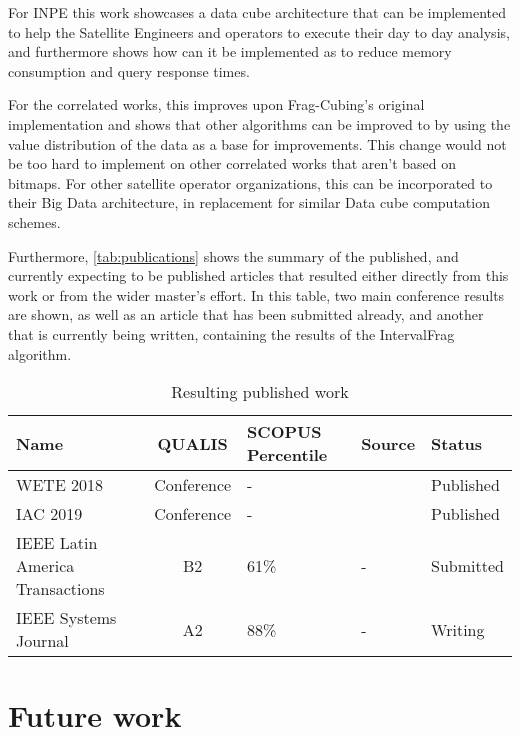 For INPE this work showcases a data cube architecture that can be implemented to help the Satellite Engineers and operators to execute their day to day analysis, and furthermore shows how can it be implemented as to reduce memory consumption and query response times.

For the correlated works, this improves upon Frag-Cubing's original implementation and shows that other algorithms can be improved to by using the value distribution of the data as a base for improvements.
This change would not be too hard to implement on other correlated works that aren't based on bitmaps.
For other satellite operator organizations, this can be incorporated to their Big Data architecture, in replacement for similar Data cube computation schemes.

Furthermore, \autoref{tab:publications} shows the summary of the published, and currently expecting to be published articles that resulted either directly from this work or from the wider master's effort.
In this table, two main conference results are shown, as well as an article that has been submitted already, and another that is currently being written, containing the results of the IntervalFrag algorithm.

\begin{table}[!htb]
  \begin{center}
    \caption{Resulting published work}\label{tab:publications}
    \begin{tabular}{|C{2.3cm}|c|C{2.2cm}|C{2.4cm}|C{2.9cm}|}
      \hline
      \textbf{Name} &\bfseries QUALIS & \bfseries SCOPUS Percentile & \bfseries Source &\bfseries Status \\
      \hline
      WETE 2018 & Conference & - & \cite{PereiraFerrSilv:2018:StApOL} & Published \\
      \hline
      IAC 2019 & Conference & - & \cite{pereiraLessonsLearnedSystems2019} & Published \\
      \hline
      IEEE Latin America Transactions & B2 & 61\% & - & Submitted \\
      \hline
      IEEE Systems Journal & A2 & 88\% & - & Writing \\
      \hline
    \end{tabular}
  \end{center}
\end{table}

\section{Future work}\label{ch:concl:future}

